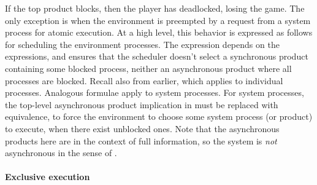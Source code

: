 \documentclass[copyright]{eptcs}
\begin{document}
If the top product blocks, then the player has deadlocked, losing the game.
The only exception is when the environment is preempted by a request from a system process for atomic execution.
At a high level, this behavior is expressed as follows for scheduling the environment processes.
The expression  depends on the  expressions, and ensures that the scheduler doesn't select a synchronous product containing some blocked process, neither an asynchronous product where all processes are blocked.
Recall also  from earlier, which applies to individual processes.
Analogous formulae apply to system processes.
For system processes, the top-level asynchronous product implication in  must be replaced with equivalence, to force the environment to choose some system process (or product) to execute, when there exist unblocked ones.
Note that the asynchronous products here are in the context of full information, so the system is {\em not} asynchronous in the sense of \cite{Klein12vmcai,Pnueli09memocode}.


\paragraph{Exclusive execution}
\end{document}
